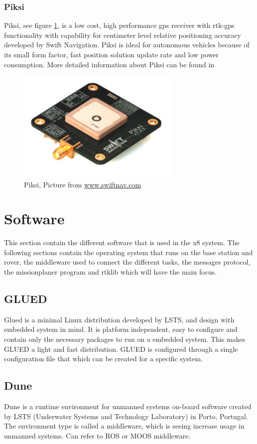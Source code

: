 \subsubsection{Piksi}\label{ss:Piksi}
Piksi, see figure \ref{figure:Piksi}, is a low cost, high performance \gls{gps} receiver with \gls{rtk-gps} functionality with capability for centimeter level relative positioning accuracy developed by Swift Navigation. Piksi is ideal for autonomous vehicles because of its small form factor, fast position solution update rate and low power consumption. 
More detailed information about Piksi can be found in \citep{Piksiv231}
\begin{figure}[H]
	\centering
		\includegraphics[width=0.7\textwidth]{figs/piksi_top.jpg}
		\caption{Piksi, Picture from \url{www.swiftnav.com}}
		\label{figure:Piksi}
\end{figure}
\section{Software}
This section contain the different software that is used in the x8 system. The following sections contain the operating system that runs on the base station and rover, the middleware used to connect the different tasks, the messages protocol, the missionplaner program and rtklib which will have the main focus.\subsection{GLUED}
Glued is a minimal Linux distribution developed by LSTS, and design with embedded system in mind. It is platform independent, easy to configure and contain only the necessary packages to run on a embedded system. This makes GLUED a light and fast distribution. GLUED is configured through a single configuration file that which can be created for a specific system. 
\subsection{Dune}
Dune is a runtime environment for unmanned systems on-board software created by LSTS (Underwater Systems and Technology Laboratory) in Porto, Portugal. The environment type is called a middleware, which is seeing increase usage in unmanned systems. Can refer to ROS or MOOS middleware.

